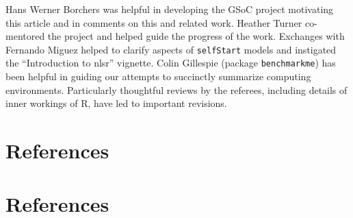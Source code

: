 Hans Werner Borchers was helpful in developing the GSoC project motivating this article
and in comments on this and related work. Heather Turner co-mentored the project
and helped guide the progress of the work. Exchanges with Fernando Miguez helped to
clarify aspects of \texttt{selfStart} models and instigated the ``Introduction to nlsr''
vignette. Colin Gillespie (package \texttt{benchmarkme}) has been helpful in guiding our
attempts to succinctly summarize computing environments. Particularly thoughtful
reviews by the referees, including details of inner workings of R,
have led to important revisions.

\hypertarget{references}{%
\section{References}\label{references}}

\hypertarget{references-1}{%
\section*{References}\label{references-1}}

